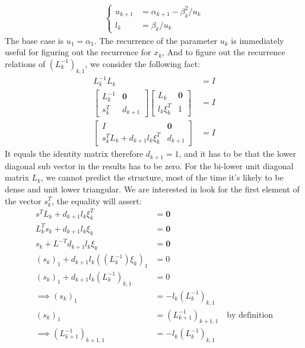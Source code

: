\documentclass[]{article}
\theoremstyle{definition}
\begin{document}
            \begin{align}
                \begin{cases}
                    u_{k + 1} &= \alpha_{k + 1} - \beta_k^2/u_k
                    \\
                    l_k &= \beta_k/u_k
                \end{cases}
            \end{align}
            The base case is $u_1 = \alpha_1$. The recurrence of the parameter $u_k$ is immediately useful for figuring out the recurrence for $x_k$, And to figure out the recurrence relations of $(L^{-1}_k)_{k, 1}$, we consider the following fact: 
            \begin{align}
                L^{-1}_k L_k &= I 
                \\
                \begin{bmatrix}
                    L^{-1}_k & \mathbf{0} \\
                    s_k^T & d_{k + 1}
                \end{bmatrix}
                \begin{bmatrix}
                    L_k & \mathbf{0} \\
                    l_k \xi_k^T & 1
                \end{bmatrix} &= I
                \\
                \begin{bmatrix}
                    I & \mathbf{0} \\ 
                    s_k^TL_k + d_{k + 1}l_k \xi_k^T &d_{k + 1}
                \end{bmatrix} &= I
            \end{align}
            It equals the identity matrix therefore $d_{k + 1} = 1$, and it has to be that the lower diagonal sub vector in the results has to be zero. For the bi-lower unit diagonal matrix $L_k$, we cannot predict the structure, most of the time it's likely to be dense and unit lower triangular. We are interested in look for the first element of the vector $s_k^T$, the equality will assert: 
            \begin{align}
                s^TL_k + d_{k + 1}l_k \xi_k^T &= \mathbf{0}
                \\
                L_k^{T}s_k + d_{k + 1}l_k \xi_k &= \mathbf{0}
                \\
                s_k + L^{-T} d_{k + 1}l_k \xi_k &= \mathbf{0}
                \\
                (s_k)_1 + d_{k + 1}l_k ((L^{-1}_k)\xi_k)_1 &= 0
                \\
                (s_k)_1 + d_{k + 1}l_k(L^{-1}_k)_{k , 1} &= 0
                \\\implies
                (s_k)_1 &= - l_k(L^{-1}_k)_{k, 1} 
                \\
                (s_k)_1 &= (L^{-1}_{k + 1})_{k + 1, 1}  \quad \text{by definition}
                \\
                \implies
                (L^{-1}_{k + 1})_{k + 1, 1} &=
                -l_k(L^{-1}_k)_{k, 1}
            \end{align}
\end{document}
